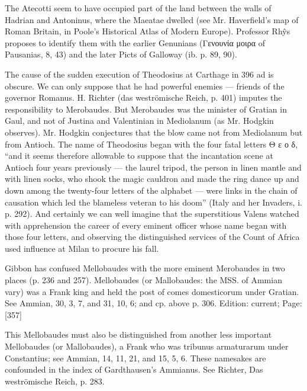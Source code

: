 The Atecotti seem to have occupied part of the land between the walls of Hadrian and Antoninus, where the Maeatae dwelled (see Mr. Haverfield\texthebrew{}’s map of Roman Britain, in Poole\texthebrew{}’s Historical Atlas of Modern Europe). Professor Rhŷs proposes to identify them with the earlier Genunians (\textgreek{Γενουνία μοιρα} of Pausanias, 8, 43) and the later Picts of Galloway (ib. p. 89, 90).


The cause of the sudden execution of Theodosius at Carthage in 396 ad is obscure. We can only suppose that he had powerful enemies \texthebrew{—} friends of the governor Romanus. H. Richter (das weströmische Reich, p. 401) imputes the responsibility to Merobaudes. But Merobaudes was the minister of Gratian in Gaul, and not of Justina and Valentinian in Mediolanum (as Mr. Hodgkin observes). Mr. Hodgkin conjectures that the blow came not from Mediolanum but from Antioch. The name of Theodosius began with the four fatal letters \textgreek{Θ ε ο δ}, \texthebrew{“}and it seems therefore allowable to suppose that the incantation scene at Antioch four years previously \texthebrew{—} the laurel tripod, the person in linen mantle and with linen socks, who shook the magic cauldron and made the ring dance up and down among the twenty-four letters of the alphabet \texthebrew{—} were links in the chain of causation which led the blameless veteran to his doom\texthebrew{}” (Italy and her Invaders, i. p. 292). And certainly we can well imagine that the superstitious Valens watched with apprehension the career of every eminent officer whose name began with those four letters, and observing the distinguished services of the Count of Africa used influence at Milan to procure his fall.


Gibbon has confused Mellobaudes with the more eminent Merobaudes in two places (p. 236 and 257). Mellobaudes (or Mallobaudes: the MSS. of Ammian vary) was a Frank king and held the post of comes domesticorum under Gratian. See Ammian, 30, 3, 7, and 31, 10, 6; and cp. above p. 306.
Edition: current; Page: [357]

This Mellobaudes must also be distinguished from another less important Mellobaudes (or Mallobaudes), a Frank who was tribunus armaturarum under Constantius; see Ammian, 14, 11, 21, and 15, 5, 6. These namesakes are confounded in the index of Gardthausen\texthebrew{}’s Ammianus. See Richter, Das weströmische Reich, p. 283.

